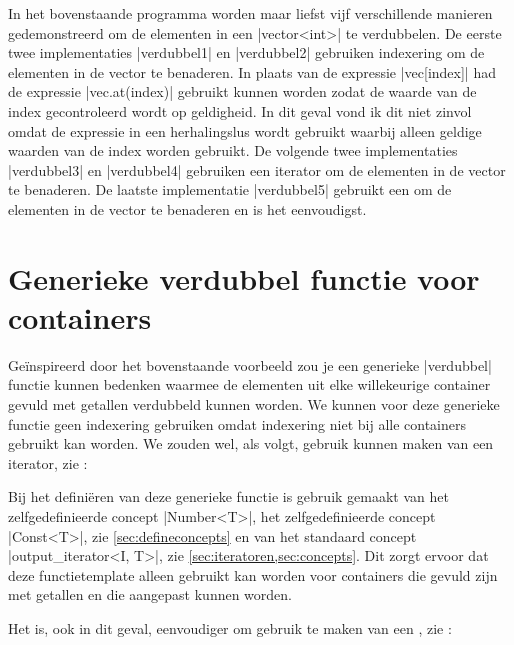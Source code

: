 \begin{cpplstShortInline}

In het bovenstaande programma worden maar liefst vijf verschillende manieren gedemonstreerd om de elementen in een |vector<int>| te verdubbelen.
De eerste twee implementaties |verdubbel1| en |verdubbel2| gebruiken indexering om de elementen in de vector te benaderen.
In plaats van de expressie |vec[index]| had de expressie |vec.at(index)| gebruikt kunnen worden zodat de waarde van de index gecontroleerd wordt op geldigheid.
In dit geval vond ik dit niet zinvol omdat de expressie in een herhalingslus wordt gebruikt waarbij alleen geldige waarden van de index worden gebruikt.
De volgende twee implementaties |verdubbel3| en |verdubbel4| gebruiken een iterator om de elementen in de vector te benaderen.
De laatste implementatie |verdubbel5| gebruikt een  om de elementen in de vector te benaderen en is het eenvoudigst.

\section{Generieke verdubbel functie voor containers}
\label{sec:generiekeverdubbel}
Geïnspireerd door het bovenstaande voorbeeld zou je een generieke |verdubbel| functie kunnen bedenken waarmee de elementen uit elke willekeurige container gevuld met getallen verdubbeld kunnen worden.
We kunnen voor deze generieke functie geen indexering gebruiken omdat indexering niet bij alle containers gebruikt kan worden.
We zouden wel, als volgt, gebruik kunnen maken van een iterator, zie :


Bij het definiëren van deze generieke functie is gebruik gemaakt van het zelfgedefinieerde concept |Number<T>|, het zelfgedefinieerde concept |Const<T>|, zie \cref{sec:defineconcepts} en van het standaard concept |output_iterator<I, T>|, zie \cref{sec:iteratoren,sec:concepts}.
Dit zorgt ervoor dat deze functietemplate alleen gebruikt kan worden voor containers die gevuld zijn met getallen en die aangepast kunnen worden.

Het is, ook in dit geval, eenvoudiger om gebruik te maken van een , zie :



\end{cpplstShortInline}
